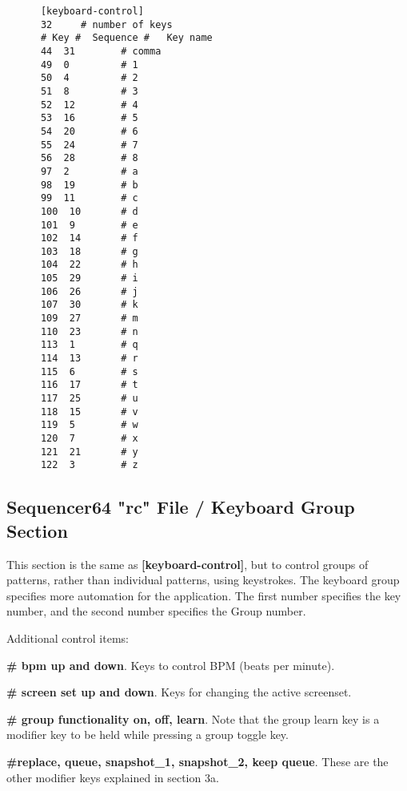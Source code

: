   \begin{verbatim}
      [keyboard-control]
      32     # number of keys
      # Key #  Sequence #   Key name
      44  31        # comma
      49  0         # 1
      50  4         # 2
      51  8         # 3
      52  12        # 4
      53  16        # 5
      54  20        # 6
      55  24        # 7
      56  28        # 8
      97  2         # a
      98  19        # b
      99  11        # c
      100  10       # d
      101  9        # e
      102  14       # f
      103  18       # g
      104  22       # h
      105  29       # i
      106  26       # j
      107  30       # k
      109  27       # m
      110  23       # n
      113  1        # q
      114  13       # r
      115  6        # s
      116  17       # t
      117  25       # u
      118  15       # v
      119  5        # w
      120  7        # x
      121  21       # y
      122  3        # z
   \end{verbatim}

\subsection{Sequencer64 "rc" File / Keyboard Group Section}
\label{subsec:seq64_rc_file_keyboard_group}

   This section is the same as
   \textbf{[keyboard-control]}, but to control groups of patterns, rather than
   individual patterns, using keystrokes.
   The keyboard group specifies more automation for the application.  The
   first number specifies the key number, and the second number specifies
   the Group number.

   Additional control items:

   \begin{enumber}
      \item \textbf{\# bpm up and down}.
         Keys to control BPM (beats per minute).
      \item \textbf{\# screen set up and down}.
         Keys for changing the active screenset.
      \item \textbf{\# group functionality on, off, learn}.
         Note that the group learn key is a modifier key to be held while 
         pressing a group toggle key.
      \item \textbf{\#replace, queue, snapshot\_1, snapshot\_2, keep queue}.
         These are the other modifier keys explained in section 3a.
   \end{enumber}

